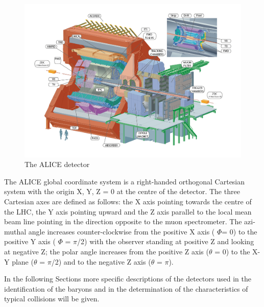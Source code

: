\begin{figure}[htbp]
\begin{center}
\includegraphics[width=14.cm]{./Version1/FigChapter4/FigureALICE}
\caption{ The ALICE detector}
\label{fig:alicedetector}
\end{center}
\end{figure}


The ALICE global coordinate system \cite{cite:ALICEcoord} is a right-handed orthogonal Cartesian system with the origin X, Y, Z = 0 at the centre of the detector. The three Cartesian axes are defined as follows: the X axis pointing towards the centre of the LHC, the Y axis pointing upward and the Z axis parallel to the local mean beam line pointing in the direction opposite to the muon spectrometer. The azi- muthal angle increases counter-clockwise from the positive X axis ( $\Phi$= 0) to the positive Y axis (  $\Phi$ = $\pi$/2) with the observer standing at positive Z and looking at negative Z; the polar angle increases from the positive Z axis ($\theta$ = 0) to the X-Y plane ($\theta$ = $\pi$/2) and to the negative Z axis ($\theta$ = $\pi$).

In the following Sections more specific descriptions of the detectors used in the identification of the \xis baryons and in the determination of the characteristics of typical collisions will be given. \\

